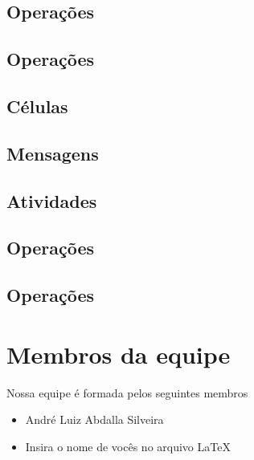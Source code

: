 \documentclass{article}
\begin{document}
        \subsection{Operações}
        \subsection{Operações}
        \subsection{Células}
        \subsection{Mensagens}
        \subsection{Atividades}
        \subsection{Operações}
        \subsection{Operações}


    \section[Equipe]{Membros da equipe}

    Nossa equipe é formada pelos seguintes membros
    \begin{itemize}
        \item André Luiz Abdalla Silveira
        \item Insira o nome de vocês no arquivo \LaTeX
    \end{itemize}
\end{document}

